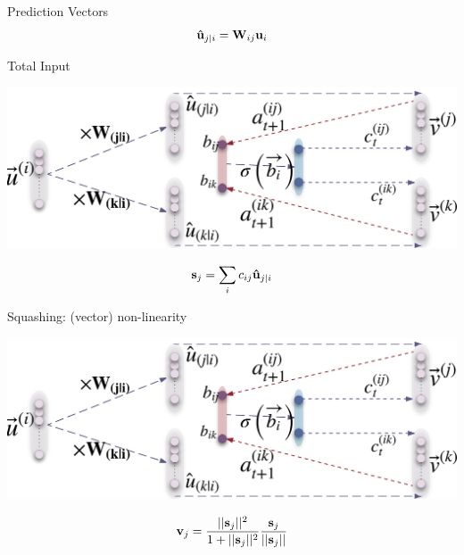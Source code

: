 \documentclass{beamer}
\begin{document}
{\begin{frame}{Prediction Vectors}
      \begin{equation}
        {\bf \hat{u}}_{j|i} = {\bf W}_{ij}{\bf u}_i 
        \label{eq:predict-vecs}
      \end{equation}
    \end{frame}

    \begin{frame}{Total Input}
      \begin{center}
        \includegraphics[width=.6\textwidth]{../img/capsRouting.png}
      \end{center}

      \begin{equation}
        {\bf s}_j = \sum_i c_{ij} {\bf \hat{u}}_{j|i}
        \label{eq:total-input}
      \end{equation}
    \end{frame}

    \begin{frame}{Squashing: (vector) non-linearity}
      \begin{center}
        \includegraphics[width=.6\textwidth]{../img/capsRouting.png}
      \end{center}

      \begin{equation}
        {\bf v}_j = \frac{||{\bf s}_j||^2}{1+||{\bf s}_j||^2} \frac{{\bf s}_j}{||{\bf s}_j||}
        \label{eq:squash}
      \end{equation}
      \pause
    \end{frame}
  }
\end{document}
